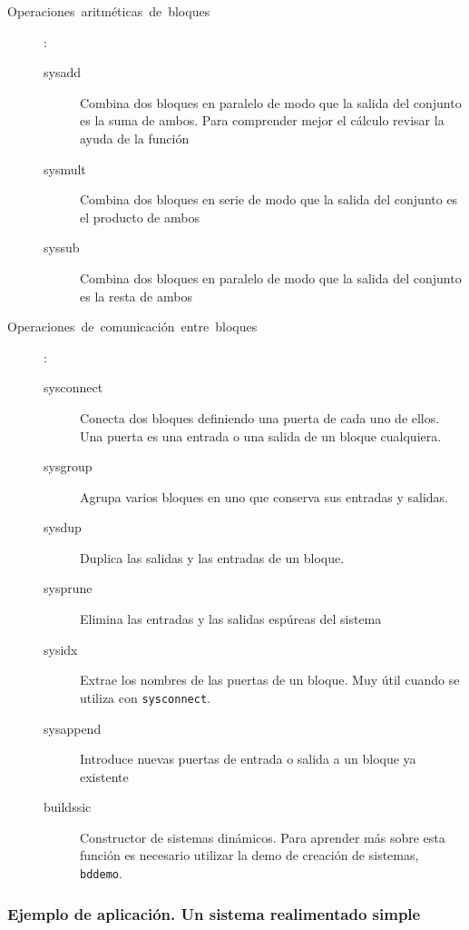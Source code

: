 \begin{description}
\item [Operaciones~aritméticas~de~bloques]:

  \begin{description}
  \item [sysadd]Combina dos bloques en paralelo de modo
    que la salida del conjunto es la suma de ambos. Para comprender
    mejor el cálculo revisar la ayuda de la función
  \item [sysmult]Combina dos bloques en serie de modo
    que la salida del conjunto es el producto de ambos
  \item [syssub]Combina dos bloques en paralelo de modo
    que la salida del conjunto es la resta de ambos
  \end{description}
\item [Operaciones~de~comunicación~entre~bloques]:

  \begin{description}
  \item [sysconnect]Conecta dos bloques definiendo
    una puerta de cada uno de ellos. Una puerta es una entrada o una
    salida de un bloque cualquiera.
  \item [sysgroup]Agrupa varios bloques en uno que
    conserva sus entradas y salidas.
  \item [sysdup]Duplica las salidas y las entradas de un
    bloque.
  \item [sysprune]Elimina las entradas y las salidas
    espúreas del sistema
  \item [sysidx]Extrae los nombres de las puertas de un
    bloque.  Muy útil cuando se utiliza con \texttt{sysconnect}.
  \item [sysappend]Introduce nuevas puertas de
    entrada o salida a un bloque ya existente
  \item [buildssic]Constructor de sistemas dinámicos.
    Para aprender más sobre esta función es necesario utilizar la demo
    de creación de sistemas, \texttt{bddemo}.
  \end{description}
\end{description}

\subsubsection{Ejemplo de aplicación. Un sistema realimentado simple}

